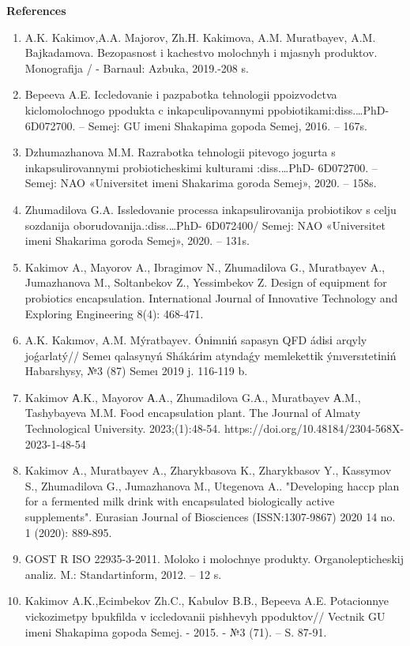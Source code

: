 \begin{center}
{\bfseries References}
\end{center}

\begin{enumerate}
\item
A.K. Kakimov,A.A. Majorov, Zh.H. Kakimova, A.M. Muratbayev, A.M.
Bajkadamova. Bezopasnost\textquotesingle{} i kachestvo molochnyh i
mjasnyh produktov. Monografija / - Barnaul: Azbuka, 2019.-208 s.

\item
Bepeeva A.E. Iccledovanie i pazpabotka tehnologii ppoizvodctva
kiclomolochnogo ppodukta c inkapculipovannymi
ppobiotikami:diss.\ldots PhD- 6D072700. -- Semej: GU imeni Shakapima
gopoda Semej, 2016. -- 167s.

\item
Dzhumazhanova M.M. Razrabotka tehnologii pit\textquotesingle evogo
jogurta s inkapsulirovannymi probioticheskimi kul\textquotesingle turami
:diss.\ldots PhD- 6D072700. -- Semej: NAO «Universitet imeni Shakarima
goroda Semej», 2020. -- 158s.

\item
Zhumadilova G.A. Issledovanie processa inkapsulirovanija probiotikov
s cel\textquotesingle ju sozdanija oborudovanija.:diss.\ldots PhD-
6D072400/ Semej: NAO «Universitet imeni Shakarima goroda Semej», 2020.
-- 131s.

\item
Kakimov A., Mayorov A., Ibragimov N., Zhumadilova G., Muratbayev A.,
Jumazhanova M., Soltanbekov Z., Yessimbekov Z. Design of equipment for
probiotics encapsulation. International Journal of Innovative Technology
and Exploring Engineering 8(4): 468-471.

\item
A.K. Kakımov, A.M. Mýratbayev. Ónіmnіń sapasyn QFD ádіsі arqyly
joǵarlatý// Semeı qalasynyń Shákárіm atyndaǵy memlekettіk
ýnıversıtetіnіń Habarshysy, №3 (87) Semeı 2019 j. 116-119 b.

\item
Kakimov А.K., Mayorov А.A., Zhumadilova G.A., Muratbayev А.M.,
Tashybayeva M.M. Food encapsulation plant. The Journal of Almaty
Technological University. 2023;(1):48-54.
https://doi.org/10.48184/2304-568X-2023-1-48-54

\item
Kakimov A., Muratbayev A., Zharykbasova K., Zharykbasov Y., Kassymov
S., Zhumadilova G., Jumazhanova M., Utegenova A.. "Developing haccp plan
for a fermented milk drink with encapsulated biologically active
supplements". Eurasian Journal of Biosciences (ISSN:1307-9867) 2020 14
no. 1 (2020): 889-895.

\item
GOST R ISO 22935-3-2011. Moloko i molochnye produkty.
Organolepticheskij analiz. M.: Standartinform, 2012. -- 12 s.

\item
Kakimov A.K.,Ecimbekov Zh.C., Kabulov B.B., Bepeeva A.E. Potacionnye
vickozimetpy bpukfil\textquotesingle da v iccledovanii pishhevyh
ppoduktov// Vectnik GU imeni Shakapima gopoda Semej. - 2015. - №3 (71).
-- S. 87-91.
\end{enumerate}

